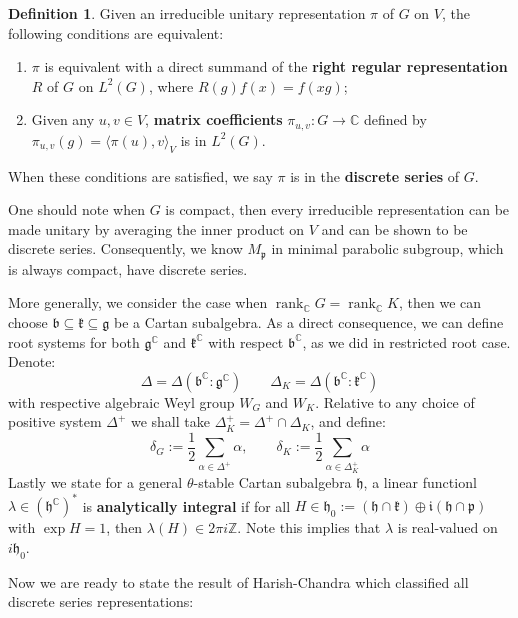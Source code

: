 \documentclass[11pt]{report}
\theoremstyle{definition}
\newtheorem{Def}{Definition}[chapter]
\theoremstyle{plain}
\DeclareMathOperator{\rk}{rank}
\newcommand{\complex}{\mathbb{C}}
\newcommand{\integer}{\mathbb{Z}}
\newcommand{\brac}[1]{\langle #1 \rangle}
\newcommand{\Lie}[1]{\mathfrak{#1}}
\begin{document}
\begin{Def}\label{knapp9.6}
	\cite[Propsition~9.6]{knapp2016} Given an irreducible unitary representation $\pi$ of $G$ on $V$, the following conditions are equivalent:
	\begin{enumerate}
		\item $\pi$ is equivalent with a direct summand of the \textbf{right regular representation} $R$ of $G$ on $L^2(G)$, where $R(g)f(x)=f(xg)$;
		\item Given any $u,v\in V$, \textbf{matrix coefficients} $\pi_{u,v}:G\to \complex$ defined by $\pi_{u,v}(g)=\brac{\pi(u),v}_V$ is in $L^2(G)$.
	\end{enumerate}
When these conditions are satisfied, we say $\pi$ is in the \textbf{discrete series} of $G$.
\end{Def}
One should note when $G$ is compact, then every irreducible representation can be made unitary by averaging the inner product on $V$ and can be shown to be discrete series. Consequently, we know $M_\Lie{p}$ in minimal parabolic subgroup, which is always compact, have discrete series. 
\par More generally, we consider the case when $\rk_\complex G=\rk_\complex K$, then we can choose $\Lie{b\subseteq k\subseteq g}$ be a Cartan subalgebra. As a direct consequence,  we can define root systems for both $\Lie{g}^\complex$ and $\Lie{k}^\complex$ with respect $\Lie{b}^\complex$, as we did in restricted root case. Denote:
\begin{equation}
\Delta=\Delta(\Lie{b}^\complex: \Lie{g}^\complex)\qquad \Delta_K=\Delta(\Lie{b}^\complex:\Lie{k}^\complex)
\end{equation}
with respective algebraic Weyl group $W_G$ and $W_K$. Relative to any choice of positive system $\Delta^+$ we shall take $\Delta_K^+=\Delta^+\cap \Delta_K$, and define:
\begin{equation}
\delta_G:=\frac{1}{2}\sum_{\alpha\in \Delta^+}\alpha, \qquad \delta_K:=\frac{1}{2}\sum_{\alpha\in \Delta^+_K}\alpha
\end{equation}
Lastly we state for a general $\theta$-stable Cartan subalgebra $\Lie{h}$, a linear functionl $\lambda\in (\Lie{h}^\complex)^*$ is \textbf{analytically integral} if for all $H\in \Lie{h}_0:=\Lie{(h\cap k)\oplus i(h\cap p)}$ with $\exp H=1$, then $\lambda(H)\in 2\pi i\integer$. Note this implies that $\lambda$ is real-valued on $i\Lie{h}_0$.
\par Now we are ready to state the result of Harish-Chandra \cite{harish1966} which classified all discrete series representations:
\end{document}
